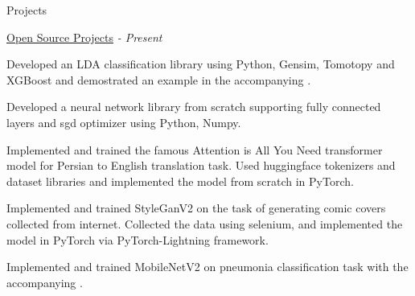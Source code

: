 \documentclass[../professional-cv.tex]{subfiles}
\begin{document}
	\begin{rSection}{Projects}
		
		\begin{rProjectSection}
			{\href{https://github.com/FeryET}{Open Source Projects}}
			{ \em {} - Present }
			{}{}			
			\item \href{https://github.com/FeryET/lda_classification}{\faGithub} Developed an LDA classification library using Python, Gensim, Tomotopy and XGBoost and demostrated an example in the accompanying .
			\item \href{https://github.com/FeryET/scratch_nn_lib}{\faGithub} Developed a neural network library from scratch supporting fully connected layers and sgd optimizer using Python, Numpy.
			\item \href{https://github.com/FeryET/persian-to-english-transformer}{\faGithub} Implemented and trained the famous Attention is All You Need transformer model for Persian to English translation task. Used huggingface tokenizers and dataset libraries and implemented the model from scratch in PyTorch.
			\item \href{https://github.com/FeryET/comic-cover-generator}{\faGithub} Implemented and trained StyleGanV2 on the task of generating comic covers collected from internet. Collected the data using selenium, and implemented the model in PyTorch via PyTorch-Lightning framework.
			\item \href{https://github.com/FeryET/pneumonia_analysis}{\faGithub} Implemented and trained MobileNetV2 on pneumonia classification task with the accompanying .
			
			
			
		\end{rProjectSection}
		
		
	\end{rSection}
\end{document}
